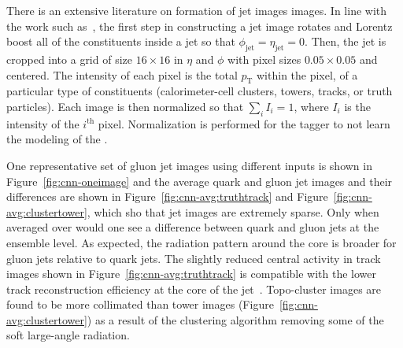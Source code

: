 There is an extensive literature on formation of jet images images. In line with the work such as~\cite{Cogan:2014oua,Almeida:2015jua}, the first step in constructing a jet image rotates and Lorentz boost all of the constituents inside a jet so that $\phi_\text{jet}=\eta_\text{jet}=0$. Then, the jet is cropped into a grid of size $16\times 16$ in $\eta$ and $\phi$ with pixel sizes $0.05\times 0.05$ and centered.  The intensity of each pixel is the total $p_\text{T}$ within the pixel, of a particular type of constituents (calorimeter-cell clusters, towers, tracks, or truth particles). Each image is then normalized so that $\sum_i I_i=1$, where $I_i$ is the intensity of the $i^\text{th}$ pixel. Normalization is performed for the tagger to not learn the modeling of the \pt.  %

One representative set of gluon jet images using different inputs is shown in Figure~\ref{fig:cnn-oneimage} and the average quark and gluon jet images and their differences are shown in Figure~\ref{fig:cnn-avg:truthtrack} and Figure~\ref{fig:cnn-avg:clustertower}, which sho that jet images are extremely sparse. Only when averaged over would one see a difference between quark and gluon jets at the ensemble level. As expected, the radiation pattern around the core is broader for gluon jets relative to quark jets.
The slightly reduced central activity in track images shown in Figure~\ref{fig:cnn-avg:truthtrack} is compatible with the lower track reconstruction efficiency at the core of the jet~\cite{Aaboud:2017all}.
Topo-cluster images are found to be more collimated than tower images (Figure~\ref{fig:cnn-avg:clustertower}) as a result of the clustering algorithm removing some of the soft large-angle radiation.


